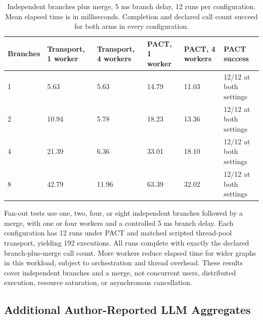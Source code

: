 \documentclass[10pt,twocolumn,a4paper]{article}
\begin{document}
\begin{table}[t]
\centering
\caption{Independent branches plus merge, 5 ms branch delay, 12 runs per configuration. Mean elapsed time is in milliseconds. Completion and declared call count succeed for both arms in every configuration.}
\label{tab:fanout-extended}
\small
\setlength{\tabcolsep}{4pt}
\renewcommand{\arraystretch}{1.12}
\begin{tabularx}{\textwidth}{@{}Xllllp{3.1cm}@{}}
\toprule
Branches & Transport, 1 worker & Transport, 4 workers & PACT, 1 worker & PACT, 4 workers & PACT success\\
\midrule
1 & 5.63 & 5.63 & 14.79 & 11.03 & 12/12 at both settings\\
2 & 10.94 & 5.78 & 18.23 & 13.36 & 12/12 at both settings\\
4 & 21.39 & 6.36 & 33.01 & 18.10 & 12/12 at both settings\\
8 & 42.79 & 11.96 & 63.39 & 32.02 & 12/12 at both settings\\
\bottomrule
\end{tabularx}
\end{table}
Fan-out tests use one, two, four, or eight independent branches followed by a merge, with one or four workers and a controlled 5 ms branch delay. Each configuration has 12 runs under PACT and matched scripted thread-pool transport, yielding 192 executions. All runs complete with exactly the declared branch-plus-merge call count. More workers reduce elapsed time for wider graphs in this workload, subject to orchestration and thread overhead. These results cover independent branches and a merge, not concurrent users, distributed execution, resource saturation, or asynchronous cancellation.


\subsection{Additional Author-Reported LLM Aggregates}
\end{document}
